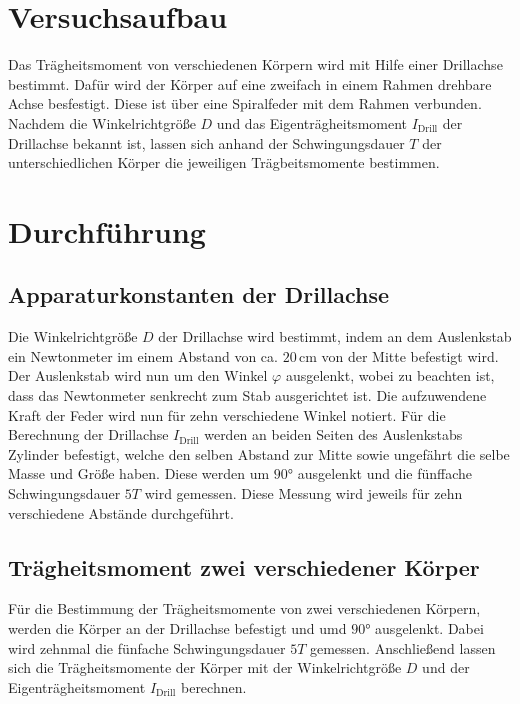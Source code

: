 
\section{Versuchsaufbau}
\label{sec:Versuchsaufbau}
Das Trägheitsmoment von verschiedenen Körpern wird mit Hilfe einer
Drillachse bestimmt. Dafür wird der Körper auf eine zweifach in einem Rahmen 
drehbare Achse besfestigt. Diese ist über eine Spiralfeder mit dem Rahmen 
verbunden. Nachdem die Winkelrichtgröße $D$ und das Eigenträgheitsmoment $I_{\text{Drill}}$
der Drillachse bekannt ist, lassen sich anhand der Schwingungsdauer $T$ der 
unterschiedlichen Körper die jeweiligen Trägbeitsmomente bestimmen.
%
\section{Durchführung}
\label{sec:Durchführung}
\subsection{Apparaturkonstanten der Drillachse}
\label{sec:Apparturkonstanten}
Die Winkelrichtgröße $D$ der Drillachse wird bestimmt, indem an dem Auslenkstab
ein Newtonmeter im einem Abstand von ca. $20\, \unit{\centi\meter}$ von der Mitte 
befestigt wird. Der Auslenkstab wird nun um den Winkel $\varphi$ ausgelenkt, wobei zu beachten ist,
dass das Newtonmeter senkrecht zum Stab ausgerichtet ist. Die aufzuwendene Kraft der Feder wird nun
für zehn verschiedene Winkel notiert. Für die Berechnung der Drillachse $I_{\text{Drill}}$ werden an beiden Seiten des 
Auslenkstabs Zylinder befestigt, welche den selben Abstand zur Mitte sowie ungefährt die selbe Masse und Größe
haben. Diese werden um $90°$ ausgelenkt und die fünffache Schwingungsdauer $5T$ wird gemessen. Diese Messung
wird jeweils für zehn verschiedene Abstände durchgeführt.
%
\subsection{Trägheitsmoment zwei verschiedener Körper}
\label{sec:TragheitZweiKörper}
Für die Bestimmung der Trägheitsmomente von zwei verschiedenen Körpern, werden die Körper an der Drillachse
befestigt und umd $90°$ ausgelenkt. Dabei wird zehnmal die fünfache Schwingungsdauer $5T$ gemessen. Anschließend
lassen sich die Trägheitsmomente der Körper mit der Winkelrichtgröße $D$ und der Eigenträgheitsmoment $I_{\text{Drill}}$ berechnen.
